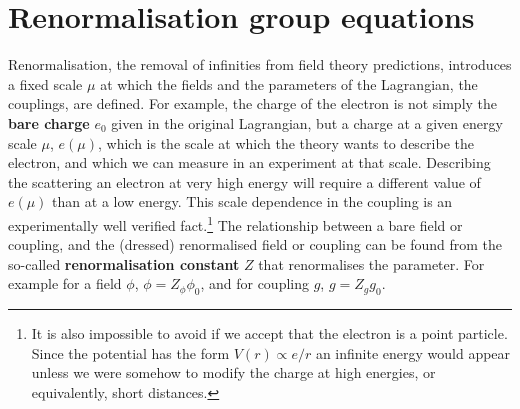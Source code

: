 \documentclass[notes.tex]{subfiles}
\begin{document}
\section{Renormalisation group equations}
\label{sec:RGE}
Renormalisation, the removal of infinities from field theory predictions, introduces a fixed scale $\mu$ at which the fields and the parameters of the Lagrangian, the couplings, are defined. For example, the charge of the electron is not simply the {\bf bare charge} $e_0$ given in the original Lagrangian, but a charge at a given energy scale $\mu$, $e(\mu)$, which is the scale at which the theory wants to describe the electron, and which we can measure in an experiment at that scale. Describing the scattering an electron at very high energy will require a different value of $e(\mu)$ than at a low energy. This scale dependence in the coupling is an experimentally well verified fact.\footnote{It is also impossible to avoid if we accept that the electron is a point particle. Since the potential has the form $V(r)\propto e/r$ an infinite energy would appear unless we were somehow to modify the charge at high energies, or equivalently, short distances.} The relationship between a bare field or coupling, and the (dressed) renormalised field or coupling can be found from the so-called {\bf renormalisation constant} $Z$ that renormalises the parameter. For example for a field $\phi$, $\phi=Z_\phi \phi_0$, and for coupling $g$, $g=Z_gg_0$.
\end{document}
